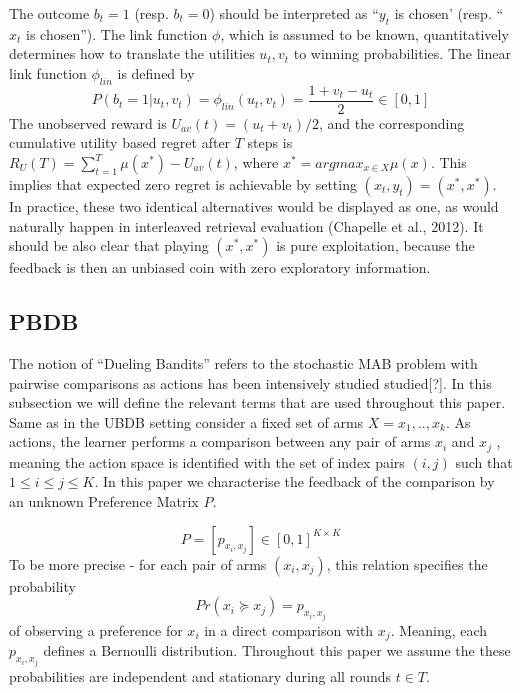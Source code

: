 \documentclass{llncs}
\begin{document}
	The outcome $b_t = 1$ (resp. $b_t = 0$) should be interpreted as “$y_t$ is chosen’ (resp. “$x_t$ is chosen”).
	The link function $\phi$, which is assumed to be known, quantitatively determines how to translate the utilities $u_t, v_t$ to winning probabilities. 
	The linear link function $\phi_{lin}$ is defined by
	$$P(b_t = 1|u_t, v_t) = \phi_{lin}(u_t, v_t) = \frac{1+v_t-u_t}{2}\in [0,1]$$
The unobserved reward is $U_{av}(t) = (u_t + v_t)/2$, and the corresponding cumulative utility based regret after $T$ steps is $R_U(T) = \sum_{t=1}^T \mu(x^*)-U_{av}(t)$, where $x^* = argmax_{x \in X} \mu(x)$. 
This implies that expected zero regret is achievable by setting $(x_t, y_t) = (x^*,x^*)$.
In practice, these two identical alternatives would be displayed as one, as would naturally happen in interleaved retrieval evaluation (Chapelle et al., 2012). 
It should be also clear that playing $(x^*,x^*)$ is pure exploitation, because the feedback is then an unbiased coin with zero exploratory information.
	
	\subsection{PBDB}
		The notion of “Dueling Bandits” refers to the stochastic MAB problem with pairwise comparisons as actions has been intensively studied studied[?].
		In this subsection we will define the relevant terms that are used throughout this paper.		
		Same as in the UBDB setting	consider a fixed set of arms $X = {x_1,..,x_k}$. 
		As actions, the learner performs a comparison between any pair of arms $x_i$ and $x_j$ , meaning the action space is identified with the set of index pairs $(i, j)$ such that $1 \leq i \leq j \leq K$. 
		In this paper we characterise the feedback of the comparison by an unknown 	Preference Matrix $P$.	
		
		$$P = [p_{x_i,x_j}] \in [0,1]^{K \times K} $$
		To be more precise - for each pair of arms $(x_i ,x_j)$, this relation specifies the probability
		\begin{equation}
		Pr(x_i \succeq x_j) = p_{x_i,x_j}
		\end{equation}
		of observing a preference for $x_i$ in a direct comparison with $x_j$. 
		Meaning, each $p_{x_i,x_j}$ defines a Bernoulli distribution.
		Throughout this paper we assume the these probabilities are independent and stationary during all rounds $t\in T$.		
		
\end{document}
